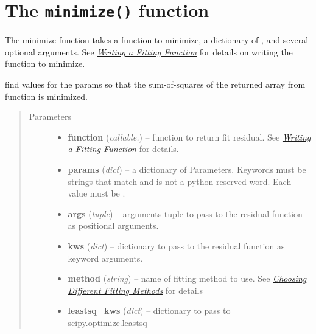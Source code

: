 \documentclass[letterpaper,10pt,english]{sphinxmanual}
\begin{document}
\section{The \texttt{minimize()} function}
\label{fitting:the-minimize-function}
The minimize function takes a function to minimize, a dictionary of
{\hyperref[parameters:Parameter]{}} , and several optional arguments.    See
{\hyperref[fitting:fit-func-label]{\emph{Writing a Fitting Function}}} for details on writing the function to minimize.

\begin{fulllineitems}
\label{fitting:minimize}
find values for the params so that the sum-of-squares of the returned array
from function is minimized.
\begin{quote}\begin{description}
\item[{Parameters}] \leavevmode\begin{itemize}
\item {} 
\textbf{function} (\emph{callable.}) -- function to return fit residual.  See {\hyperref[fitting:fit-func-label]{\emph{Writing a Fitting Function}}} for details.

\item {} 
\textbf{params} (\emph{dict}) -- a dictionary of Parameters.  Keywords must be strings
that match \code{{[}a-z\_{]}{[}a-z0-9\_{]}*} and is not a python
reserved word.  Each value must be {\hyperref[parameters:Parameter]{}}.

\item {} 
\textbf{args} (\emph{tuple}) -- arguments tuple to pass to the residual function as  positional arguments.

\item {} 
\textbf{kws} (\emph{dict}) -- dictionary to pass to the residual function as keyword arguments.

\item {} 
\textbf{method} (\emph{string}) -- name of fitting method to use. See  {\hyperref[fitting:fit-engines-label]{\emph{Choosing Different Fitting Methods}}} for details

\item {} 
\textbf{leastsq\_kws} (\emph{dict}) -- dictionary to pass to scipy.optimize.leastsq


\end{itemize}
\end{description}
\end{quote}
\end{fulllineitems}
\end{document}
